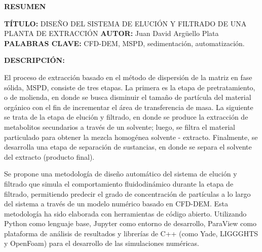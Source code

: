 \begin{center}
	\textbf{\textsc{{\Large RESUMEN}}}\\
\end{center}

\noindent
\justify

\textbf{T\'ITULO:} DISE\~NO DEL SISTEMA DE ELUCI\'ON Y FILTRADO DE UNA PLANTA DE EXTRACCI\'ON\footnotemark
\noindent
\justify
\textbf{AUTOR:} Juan David Arg\"uello Plata\footnotemark
\noindent
\justify
\textbf{PALABRAS CLAVE:} CFD-DEM, MSPD, sedimentaci\'on, automatizaci\'on.


\noindent
\justify


\textbf{DESCRIPCI\'ON:} 

\noindent
\justify

El proceso de extracci\'on basado en el m\'etodo de dispersi\'on de la matriz en fase s\'olida, MSPD, consiste de tres etapas. La primera es la etapa de pretratamiento, o de molienda, en donde se busca disminuir el tama\~no de part\'icula del material org\'anico con el fin de incrementar el \'area de transferencia de masa. La siguiente se trata de la etapa de eluci\'on y filtrado, en donde se produce la extracci\'on de metabolitos secundarios a trav\'es de un solvente; luego, se filtra el material particulado para obtener la mezcla homog\'enea solvente - extracto. Finalmente, se desarrolla una etapa de separaci\'on de sustancias, en donde se separa el solvente del extracto (producto final).

\noindent
\justify

Se propone una metodolog\'ia de dise\~no autom\'atico del sistema de eluci\'on y filtrado que simula el comportamiento fluidodin\'amico durante la etapa de filtrado, permitiendo predecir el grado de concentraci\'on de part\'iculas a lo largo del sistema a trav\'es de un modelo num\'erico basado en CFD-DEM. Esta metodolog\'ia ha sido elaborada con herramientas de c\'odigo abierto. Utilizando Python como lenguaje base, Jupyter como entorno de desarrollo, ParaView como plataforma de an\'alisis de resultados y librer\'ias de C++ (como Yade, LIGGGHTS y OpenFoam) para el desarrollo de las simulaciones num\'ericas. 

